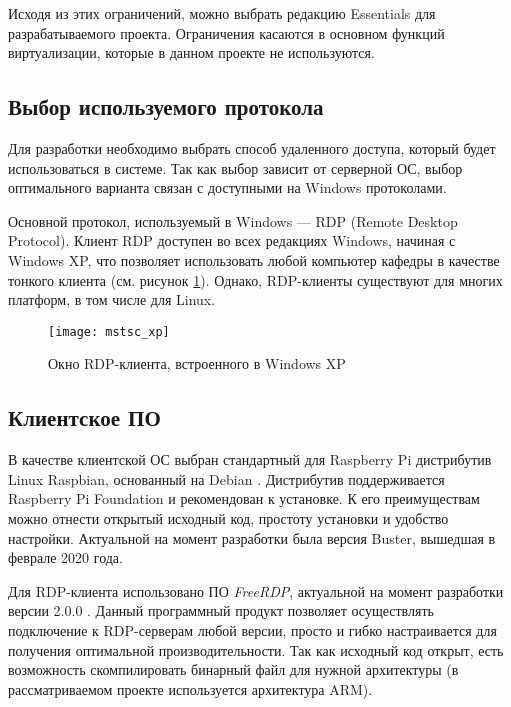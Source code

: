 Исходя из этих ограничений, можно выбрать редакцию Essentials для разрабатываемого
проекта. Ограничения касаются в основном функций виртуализации, которые в данном проекте
не используются.

\subsection{Выбор используемого протокола}

Для разработки необходимо выбрать способ удаленного доступа, который будет
использоваться в системе. Так как выбор зависит от серверной ОС, выбор оптимального
варианта связан с доступными на Windows протоколами.

Основной протокол, используемый в Windows — RDP (Remote Desktop Protocol). Клиент RDP
доступен во всех редакциях Windows, начиная с Windows XP, что позволяет использовать
любой компьютер кафедры в качестве тонкого клиента (см. рисунок \ref{pic:mstsc_xp}).
Однако, RDP-клиенты существуют для многих платформ, в том числе для Linux.

\begin{figure}[h]
    \center
    \texttt{[image: mstsc\_xp]}
    \caption{Окно RDP-клиента, встроенного в Windows XP}
    \label{pic:mstsc_xp}
\end{figure}

\subsection{Клиентское ПО}

В качестве клиентской ОС выбран стандартный для Raspberry Pi дистрибутив Linux Raspbian,
основанный на Debian \cite{ref:raspbian}.
Дистрибутив поддерживается Raspberry Pi Foundation и рекомендован к установке.
К его преимуществам можно отнести открытый исходный код, простоту установки и удобство 
настройки. 
Актуальной на момент разработки была версия Buster, вышедшая в феврале 2020 года.

Для RDP-клиента использовано ПО \textit{FreeRDP}, актуальной на момент разработки версии
2.0.0 \cite{ref:freerdp}. Данный программный продукт позволяет осуществлять подключение
к RDP-серверам любой версии, просто и гибко настраивается для получения оптимальной
производительности.  Так как исходный код открыт, есть возможность скомпилировать
бинарный файл для нужной архитектуры (в рассматриваемом проекте используется архитектура
ARM).

